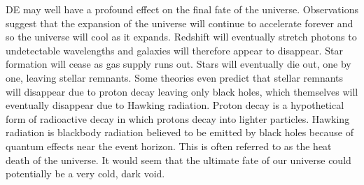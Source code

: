 \documentclass[a4paper,12pt]{article}
\begin{document}
DE may well have a profound effect on the final fate of the universe. Observations suggest that the expansion of the universe will continue to accelerate forever and so the 
universe will cool as it expands. Redshift will eventually stretch photons to undetectable wavelengths and galaxies will therefore appear to disappear. Star formation will cease 
as gas supply runs out. Stars will
eventually die out, one by one, leaving stellar remnants. Some theories even predict that stellar remnants will disappear due to proton decay leaving only black holes,
which themselves will eventually disappear due to Hawking radiation. Proton decay is a hypothetical form of radioactive decay in which protons decay into lighter particles. 
Hawking radiation is blackbody radiation believed to be emitted by black holes because of quantum
effects near the event horizon. This is often referred to as the heat death of the universe. It would seem that the ultimate fate of our universe could potentially be a very 
cold, dark void.
\end{document}
